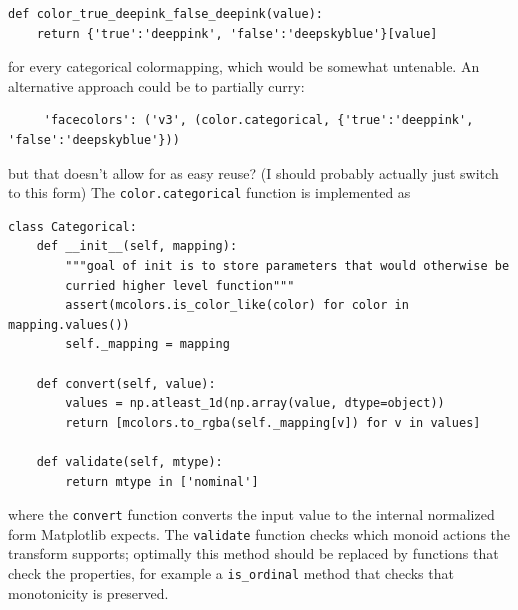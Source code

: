 \documentclass[../main.tex]{subfiles}
\begin{document}
\begin{verbatim}
def color_true_deepink_false_deepink(value):
    return {'true':'deeppink', 'false':'deepskyblue'}[value]

\end{verbatim}

for every categorical colormapping, which would be somewhat untenable. An alternative approach could be to partially curry:

\begin{verbatim}
     'facecolors': ('v3', (color.categorical, {'true':'deeppink', 'false':'deepskyblue'}))
\end{verbatim}

but that doesn't allow for as easy reuse? (I should probably actually just switch to this form) The \texttt{color.categorical} function is implemented as 

\begin{verbatim}
class Categorical:
    def __init__(self, mapping):
        """goal of init is to store parameters that would otherwise be
        curried higher level function"""
        assert(mcolors.is_color_like(color) for color in mapping.values())
        self._mapping = mapping

    def convert(self, value):
        values = np.atleast_1d(np.array(value, dtype=object))
        return [mcolors.to_rgba(self._mapping[v]) for v in values]

    def validate(self, mtype):
        return mtype in ['nominal']
\end{verbatim}

where the \texttt{convert} function converts the input value to the internal normalized form Matplotlib expects. The \texttt{validate} function checks which monoid actions the transform supports; optimally this method should be replaced by functions that check the properties, for example a \texttt{is_ordinal} method that checks that monotonicity is preserved. 

\end{document}
